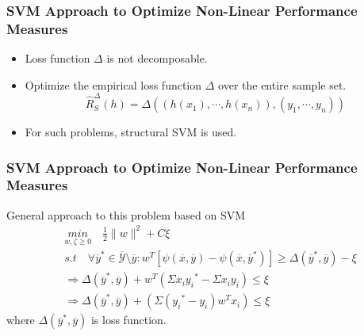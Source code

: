\documentclass{beamer}
\begin{document}

\begin{frame}
	\frametitle{SVM Approach to Optimize Non-Linear Performance Measures}
	\begin{itemize}
		\item Loss function $\Delta$ is not decomposable.
		\item Optimize the empirical loss function $\Delta$ over the entire sample set.
		\begin{equation*}
		\hat{R}_S^\Delta(h) = \Delta ((h(x_1), \cdots, h(x_n)), (y_1, \cdots, y_n))
		\end{equation*}
		\item For such problems, structural SVM is used.
	\end{itemize}
\end{frame}


\begin{frame}
	\frametitle{SVM Approach to Optimize Non-Linear Performance Measures}
	General approach to this problem based on SVM
	\begin{equation*}
	\begin{split}
	& \underset{w,\zeta \geq 0}{min} \quad \frac{1}{2}\|w\|^2+C\xi\\
	& s.t \quad \forall\overline{y}^* \in \overline{\mathcal{Y}}\setminus\overline{y}:w^T[\psi(\overline{x},\overline{y})- \psi(\overline{x},\overline{y}^*)]\geq \Delta(\overline{y}^*,\overline{y})-\xi\\
	& \Rightarrow \Delta(\overline{y}^*,\overline{y}) + w^T(\Sigma x_i{y_i}^* - \Sigma x_i{y_i}) \leq \xi\\
	& \Rightarrow \Delta(\overline{y}^*,\overline{y}) + (\Sigma ({y_i}^* - {y_i})w^Tx_i) \leq \xi
	\end{split}
	\end{equation*}
	where $\Delta(\overline{y}^*,\overline{y})$ is loss function.	
\end{frame}

\end{document}
